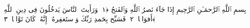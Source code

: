
  
    
  
    
    

\nopagebreak
  بِسمِ ٱللَّهِ ٱلرَّحمَـٰنِ ٱلرَّحِيمِ
  إِذَا جَآءَ نَصرُ ٱللَّهِ وَٱلفَتحُ ﴿١﴾
 وَرَأَيتَ ٱلنَّاسَ يَدخُلُونَ فِى دِينِ ٱللَّهِ أَفوَاجًۭا ﴿٢﴾
 فَسَبِّح بِحَمدِ رَبِّكَ وَٱستَغفِرهُ ۚ إِنَّهُۥ كَانَ تَوَّابًۢا ﴿٣﴾
 
